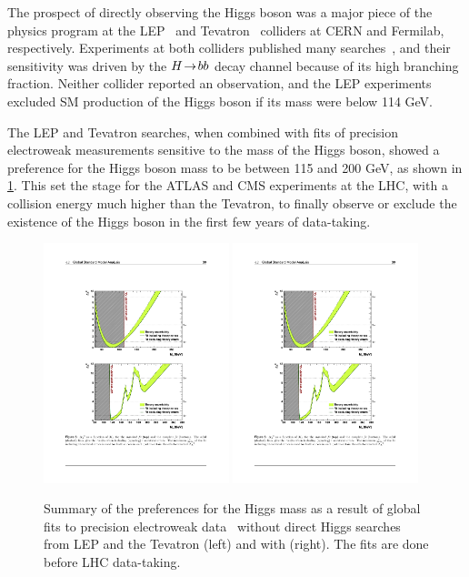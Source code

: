 The prospect of directly observing the Higgs boson was a major piece of the physics program at the LEP~\cite{1996.cern-press} and Tevatron~\cite{2001.fermilab-press} colliders at CERN and Fermilab, respectively. Experiments at both colliders published many searches~\cite{2003.lep-higgs,2013.tevatron-higgs}, and their sensitivity was driven by the $H \!\rightarrow\! bb$ decay channel because of its high branching fraction. Neither collider reported an observation, and the LEP experiments excluded SM production of the Higgs boson if its mass were below 114 GeV.

The LEP and Tevatron searches, when combined with fits of precision electroweak measurements sensitive to the mass of the Higgs boson, showed a preference for the Higgs boson mass to be between 115 and 200 GeV, as shown in \cref{fig:sm-gfitter}. This set the stage for the ATLAS and CMS experiments at the LHC, with a collision energy much higher than the Tevatron, to finally observe or exclude the existence of the Higgs boson in the first few years of data-taking.

\begin{figure}[tp]
  \centering
  \includegraphics[width=0.48\textwidth]{figures/standardmodel/gfitter_standardfit}
  \includegraphics[width=0.48\textwidth]{figures/standardmodel/gfitter_completefit}
  \caption{Summary of the preferences for the Higgs mass as a result of global fits to precision electroweak data~\cite{2009.gfitter} without direct Higgs searches from LEP and the Tevatron (left) and with (right). The fits are done before LHC data-taking.}
  \label{fig:sm-gfitter}
\end{figure}

